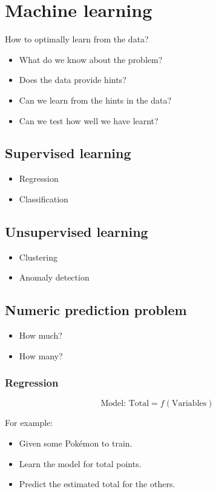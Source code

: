 \documentclass[11pt]{article}
\begin{document}
 \newpage
\section{Machine learning}
\label{sec:org2d1d16a}
How to optimally learn from the data?
\begin{itemize}
\item What do we know about the problem?
\item Does the data provide hints?
\item Can we learn from the hints in the data?
\item Can we test how well we have learnt?
\end{itemize}
\subsection{Supervised learning}
\label{sec:org13228e9}
\begin{itemize}
\item Regression
\item Classification
\end{itemize}
\subsection{Unsupervised learning}
\label{sec:orgd45b5c4}
\begin{itemize}
\item Clustering
\item Anomaly detection
\end{itemize}
\subsection{Numeric prediction problem}
\label{sec:org8a4ea0e}
\begin{itemize}
\item How much?
\item How many?
\end{itemize}
\subsubsection{Regression}
\label{sec:orge2df95e}
\[\text{Model: Total} = f(\text{Variables}) \]

For example:
\begin{itemize}
\item Given some Pokémon to train.
\item Learn the model for total points.
\item Predict the estimated total for the others.
\end{itemize}
\end{document}
